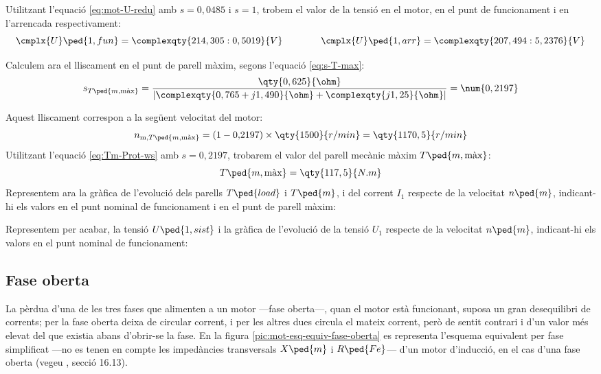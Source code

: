 \begin{exemple}
	Utilitzant l'equació \eqref{eq:mot-U-redu} amb $s=0{,}0485$ i $s=1$, trobem el valor de la tensió en el motor, en el punt de funcionament i en l'arrencada respectivament:
	\[
		\cmplx{U}\ped{1,fun} = \complexqty{214,305:0,5019}{V} \qquad \qquad
		\cmplx{U}\ped{1,arr} = \complexqty{207,494:5,2376}{V}
	\]
	
	Calculem ara el lliscament en el punt de parell màxim, segons l'equació \eqref{eq:s-T-max}:
	\[
		s_{T\ped{m,\text{màx}}} =  \frac{\qty{0,625}{\ohm}}{|\complexqty{0,765+j1,490}{\ohm} + \complexqty{j1,25}{\ohm}|} = \num{0,2197} 
	\]
	
	Aquest lliscament correspon a la següent  velocitat del motor:
	\[
		n_{\text{m},T\ped{m,\text{màx}}} = (1 - 0{,}2197) \times \qty{1500}{r/min} = \qty{1170,5}{r/min}
	\]
	Utilitzant l'equació  \eqref{eq:Tm-Prot-ws} amb
	 $s=0{,}2197$, trobarem el valor del parell mecànic màxim  $T\ped{m,\text{màx}}$:
	\[
		T\ped{m,\text{màx}} = \qty{117,5}{N.m}
	\]	
	Representem ara la gràfica de l'evolució dels parells $T\ped{load}$ i   $T\ped{m}$, i del	corrent $I_1$ respecte de la velocitat $n\ped{m}$, indicant-hi els valors en el punt nominal de funcionament i en el punt de parell màxim:
	\begin{center}
		\fontsize{10pt}{11pt}\selectfont
		
	\end{center}
	Representem per acabar, la tensió $U\ped{1,sist}$ i la gràfica de l'evolució de la tensió $U_1$ respecte de la velocitat $n\ped{m}$, indicant-hi els valors en el punt nominal de funcionament:
	\begin{center}
		\fontsize{10pt}{11pt}\selectfont
		
	\end{center}
\end{exemple}	



\subsection{Fase oberta}\label{sec:mot-fase.oberta}

La pèrdua d'una de les tres fases que alimenten a un motor ---fase oberta---, quan el motor està funcionant, suposa un gran desequilibri de corrents; per la fase oberta deixa de circular corrent, i per les altres dues circula el mateix corrent, però de sentit contrari i d'un valor més elevat del que existia abans d'obrir-se la fase.
En la figura \vref{pic:mot-esq-equiv-fase-oberta} es representa l'esquema  equivalent per fase simplificat ---no es tenen en compte les impedàncies transversals $X\ped{m}$ i $R\ped{Fe}$--- d'un   motor d'inducció, en el cas d'una fase oberta (vegeu \cite{REI}, secció 16.13).


